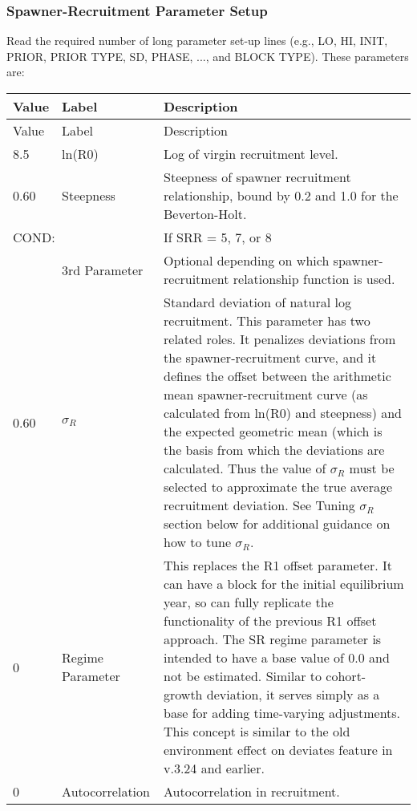 \subsubsection{Spawner-Recruitment Parameter Setup}
Read the required number of long parameter set-up lines (e.g., LO, HI, INIT, PRIOR, PRIOR TYPE, SD, PHASE, ..., and BLOCK TYPE). These parameters are:
\begin{longtable}{p{1cm} p{3cm} p{11cm}}
	\hline
	Value & Label & Description \Tstrut\Bstrut\\
	\hline
	\endfirsthead

	\hline
	Value & Label & Description \Tstrut\Bstrut\\
	\hline
	\endhead
	\hline
	\endfoot
	\endlastfoot

	8.5 & ln(R0) & Log of virgin recruitment level. \Tstrut\Bstrut\\
	\hline

	0.60 \Tstrut & Steepness & Steepness of spawner recruitment relationship, bound by 0.2 and 1.0 for the Beverton-Holt. \Bstrut\\

	\multicolumn{2}{l}{COND:} \Tstrut & If SRR = 5, 7, or 8 \\
	& 3rd Parameter & Optional depending on which spawner-recruitment relationship function is used. \Bstrut\\
	\hline

	0.60 \Tstrut & $\sigma_R$ & Standard deviation of natural log recruitment. This parameter has two related roles. It penalizes deviations from the spawner-recruitment curve, and it defines the offset between the arithmetic mean spawner-recruitment curve (as calculated from ln(R0) and steepness) and the expected geometric mean (which is the basis from which the deviations are calculated. Thus the value of $\sigma_R$ must be selected to approximate the true average recruitment deviation. See \hypertarget{TuneSigmaR}{Tuning $\sigma_R$} section below for additional guidance on how to tune $\sigma_R$. \Bstrut\\

	0\Tstrut & Regime Parameter & This replaces the R1 offset parameter. It can have a block for the initial equilibrium year, so can fully replicate the functionality of the previous R1 offset approach. The SR regime parameter is intended to have a base value of 0.0 and not be estimated. Similar to cohort-growth deviation, it serves simply as a base for adding time-varying adjustments. This concept is similar to the old environment effect on deviates feature in v.3.24 and earlier. \Bstrut\\
	\hline

	0 & Autocorrelation & Autocorrelation in recruitment. \Tstrut\Bstrut\\
	\hline
\end{longtable}


